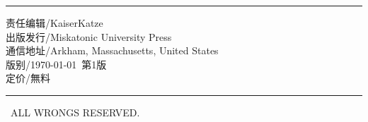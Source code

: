 \begin{titlepage}
\begingroup
\def\MyRule{\raggedright\rule{10cm}{1pt}\vspace{5pt}}
\MyRule

\raggedright\noindent%
责任编辑/KaiserKatze \\
出版发行/Miskatonic University Press \\
通信地址/Arkham, Massachusetts, United States \\
版\hspace{2em}别/\today\ 第1版 \\
定\hspace{2em}价/無料 \\
\MyRule

\textcopyleft\ ALL WRONGS RESERVED.
\endgroup

\end{titlepage}
